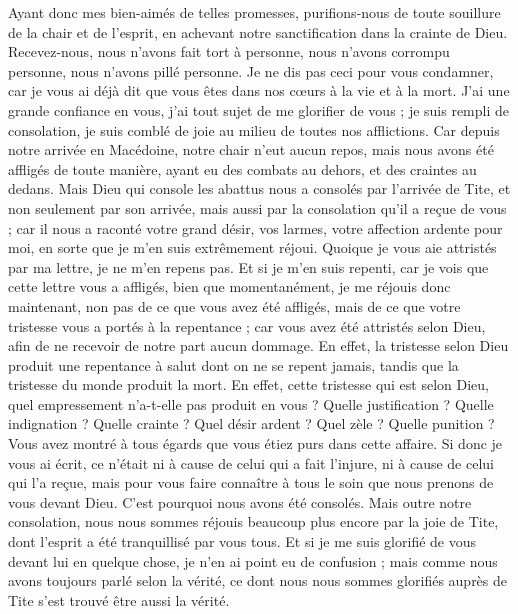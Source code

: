 \begin{multicols}{2}
\VerseOne{}Ayant donc mes bien-aimés de telles promesses, purifions-nous de toute souillure de la chair et de l'esprit, en achevant notre sanctification dans la crainte de Dieu.
Recevez-nous, nous n'avons fait tort à personne, nous n'avons corrompu personne, nous n'avons pillé personne.
Je ne dis pas ceci pour vous condamner, car je vous ai déjà dit que vous êtes dans nos cœurs à la vie et à la mort.
J'ai une grande confiance en vous, j'ai tout sujet de me glorifier de vous ; je suis rempli de consolation, je suis comblé de joie au milieu de toutes nos afflictions.
Car depuis notre arrivée en Macédoine, notre chair n’eut aucun repos, mais nous avons été affligés de toute manière, ayant eu des combats au dehors, et des craintes au dedans.
Mais Dieu qui console les abattus nous a consolés par l’arrivée de Tite,
et non seulement par son arrivée, mais aussi par la consolation qu'il a reçue de vous ; car il nous a raconté votre grand désir, vos larmes, votre affection ardente pour moi, en sorte que je m'en suis extrêmement réjoui.
Quoique je vous aie attristés par ma lettre, je ne m'en repens pas. Et si je m'en suis repenti, car je vois que cette lettre vous a affligés, bien que momentanément,
je me réjouis donc maintenant, non pas de ce que vous avez été affligés, mais de ce que votre tristesse vous a portés à la repentance ; car vous avez été attristés selon Dieu, afin de ne recevoir de notre part aucun dommage.
En effet, la tristesse selon Dieu produit une repentance à salut dont on ne se repent jamais, tandis que la tristesse du monde produit la mort.
En effet, cette tristesse qui est selon Dieu, quel empressement n’a-t-elle pas produit en vous ? Quelle justification ? Quelle indignation ? Quelle crainte ? Quel désir ardent ? Quel zèle ? Quelle punition ? Vous avez montré à tous égards que vous étiez purs dans cette affaire.
Si donc je vous ai écrit, ce n’était ni à cause de celui qui a fait l’injure, ni à cause de celui qui l’a reçue, mais pour vous faire connaître à tous le soin que nous prenons de vous devant Dieu.
C'est pourquoi nous avons été consolés. Mais outre notre consolation, nous nous sommes réjouis beaucoup plus encore par la joie de Tite, dont l’esprit a été tranquillisé par vous tous.
Et si je me suis glorifié de vous devant lui en quelque chose, je n’en ai point eu de confusion ; mais comme nous avons toujours parlé selon la vérité, ce dont nous nous sommes glorifiés auprès de Tite s’est trouvé être aussi la vérité.

\end{multicols}
